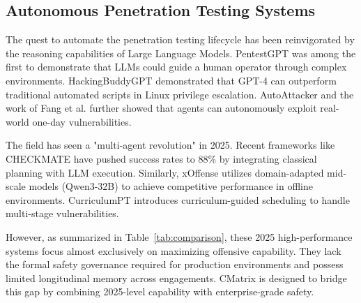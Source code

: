 \documentclass[conference,compsoc]{IEEEtran}
\begin{document}
\subsection{Autonomous Penetration Testing Systems}
The quest to automate the penetration testing lifecycle has been reinvigorated by the reasoning capabilities of Large Language Models. PentestGPT \cite{pentestgpt} was among the first to demonstrate that LLMs could guide a human operator through complex environments. HackingBuddyGPT \cite{hackingbuddygpt} demonstrated that GPT-4 can outperform traditional automated scripts in Linux privilege escalation. AutoAttacker \cite{autoattacker} and the work of Fang et al. \cite{fang2024} further showed that agents can autonomously exploit real-world one-day vulnerabilities.

The field has seen a "multi-agent revolution" in 2025. Recent frameworks like CHECKMATE \cite{checkmate2025} have pushed success rates to 88\% by integrating classical planning with LLM execution. Similarly, xOffense \cite{xoffense2025} utilizes domain-adapted mid-scale models (Qwen3-32B) to achieve competitive performance in offline environments. CurriculumPT \cite{curriculumpt2025} introduces curriculum-guided scheduling to handle multi-stage vulnerabilities.

However, as summarized in Table~\ref{tab:comparison}, these 2025 high-performance systems focus almost exclusively on maximizing offensive capability. They lack the formal safety governance required for production environments and possess limited longitudinal memory across engagements. CMatrix is designed to bridge this gap by combining 2025-level capability with enterprise-grade safety.
\end{document}
